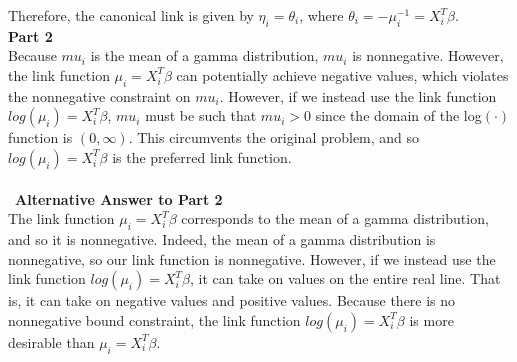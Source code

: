 \documentclass[10pt,a4paper]{article}
\begin{document}
Therefore, the canonical link is given by $\eta_{i}=\theta_{i}$, where $\theta_{i}=-\mu_{i}^{-1}=X_{i}^{T} \beta$.\\
\newline
\textbf{Part 2} \\
Because $mu_i$ is the mean of a gamma distribution, $mu_i$ is nonnegative. However, the link function $\mu_{i}=X_{i}^{T}\beta$ can potentially achieve negative values, which violates the nonnegative constraint on $mu_i$. However, if we instead use the link function $log(\mu_{i})=X_{i}^{T}\beta$, $mu_i$ must be such that $mu_i > 0$ since the domain of the log$(\cdot)$ function is $(0, \infty)$. This circumvents the original problem, and so $log(\mu_{i})=X_{i}^{T}\beta$ is the preferred link function.\\
\\\
\textbf{Alternative Answer to Part 2}\\
The link function $\mu_{i}=X_{i}^{T}\beta$ corresponds to the mean of a gamma distribution, and so it is nonnegative. Indeed, the mean of a gamma distribution is nonnegative, so our link function is nonnegative. However, if we instead use the link function $log(\mu_{i})=X_{i}^{T}\beta$, it can take on values on the entire real line. That is, it can take on negative values and positive values. Because there is no nonnegative bound constraint, the link function $log(\mu_{i})=X_{i}^{T}\beta$ is more desirable than $\mu_{i}=X_{i}^{T}\beta$.
\end{document}
